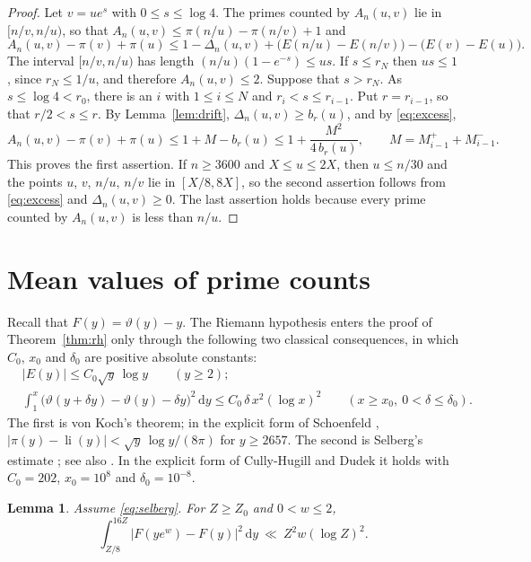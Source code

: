 \documentclass[11pt,reqno]{amsart}
\newtheorem{lemma}[theorem]{Lemma}
\theoremstyle{definition}
\theoremstyle{remark}
\numberwithin{equation}{section}
\newcommand{\dd}{\mathrm{d}}
\DeclareMathOperator{\li}{li}
\begin{document}
\begin{proof}
Let $v=ue^s$ with $0\le s\le\log4$. The primes counted by $A_n(u,v)$ lie in $[n/v,n/u)$, so that $A_n(u,v)\le\pi(n/u)-\pi(n/v)+1$ and
\begin{equation}\label{eq:excess}
 A_n(u,v)-\pi(v)+\pi(u)\le1-\Delta_n(u,v)+\bigl(E(n/u)-E(n/v)\bigr)-\bigl(E(v)-E(u)\bigr).
\end{equation}
The interval $[n/v,n/u)$ has length $(n/u)(1-e^{-s})\le us$. If $s\le r_N$ then $us\le1$, since $r_N\le1/u$, and therefore $A_n(u,v)\le2$. Suppose that $s>r_N$. As $s\le\log4<r_0$, there is an $i$ with $1\le i\le N$ and $r_i<s\le r_{i-1}$. Put $r=r_{i-1}$, so that $r/2<s\le r$. By Lemma~\ref{lem:drift}, $\Delta_n(u,v)\ge b_r(u)$, and by \eqref{eq:excess},
\[
 A_n(u,v)-\pi(v)+\pi(u)\le1+M-b_r(u)\le1+\frac{M^2}{4\,b_r(u)},\qquad M=M_{i-1}^++M_{i-1}^- .
\]
This proves the first assertion. If $n\ge3600$ and $X\le u\le2X$, then $u\le n/30$ and the points $u$, $v$, $n/u$, $n/v$ lie in $[X/8,8X]$, so the second assertion follows from \eqref{eq:excess} and $\Delta_n(u,v)\ge0$. The last assertion holds because every prime counted by $A_n(u,v)$ is less than $n/u$.
\end{proof}

\section{Mean values of prime counts}\label{sec:mean}

Recall that $F(y)=\vartheta(y)-y$. The Riemann hypothesis enters the proof of Theorem~\ref{thm:rh} only through the following two classical consequences, in which $C_0$, $x_0$ and $\delta_0$ are positive absolute constants:
\begin{align}
 &|E(y)|\le C_0\sqrt y\,\log y\qquad(y\ge2);\tag{VK}\label{eq:vonkoch}\\
 &\int_1^x\bigl(\vartheta(y+\delta y)-\vartheta(y)-\delta y\bigr)^2\,\dd y\le C_0\,\delta\,x^2(\log x)^2\qquad(x\ge x_0,\ 0<\delta\le\delta_0).\tag{MS}\label{eq:selberg}
\end{align}
The first is von Koch's theorem; in the explicit form of Schoenfeld \cite[Corollary~1]{Sch}, $|\pi(y)-\li(y)|<\sqrt y\,\log y/(8\pi)$ for $y\ge2657$. The second is Selberg's estimate \cite{Se}; see also \cite{SV}. In the explicit form of Cully-Hugill and Dudek \cite[Theorem~1]{CHD} it holds with $C_0=202$, $x_0=10^8$ and $\delta_0=10^{-8}$.

\begin{lemma}\label{lem:selberg}
Assume \eqref{eq:selberg}. For $Z\ge Z_0$ and $0<w\le2$,
\[
 \int_{Z/8}^{16Z}\bigl|F(ye^w)-F(y)\bigr|^2\,\dd y\ \ll\ Z^2w(\log Z)^2 .
\]
\end{lemma}
\end{document}
